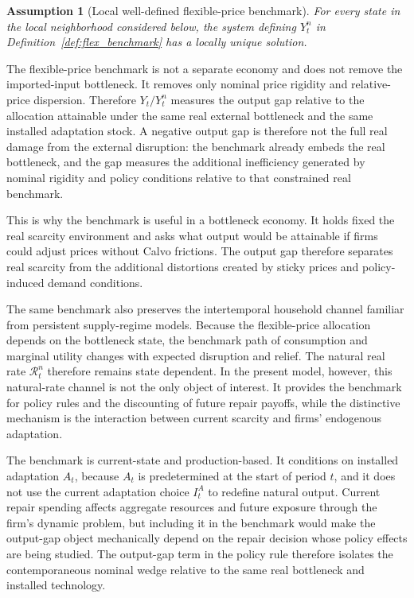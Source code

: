 ﻿\documentclass[12pt]{article}
\newtheorem{assumption}{Assumption}
\theoremstyle{remark}
\begin{document}
\begin{assumption}[Local well-defined flexible-price benchmark]\label{ass:flex_benchmark_unique}
For every state in the local neighborhood considered below, the system defining
$Y_t^n$ in Definition~\ref{def:flex_benchmark} has a locally unique solution.
\end{assumption}

The flexible-price benchmark is not a separate economy and does not remove the imported-input
bottleneck. It removes only nominal price rigidity and relative-price dispersion. Therefore
$Y_t/Y_t^n$ measures the output gap relative to the allocation attainable under the same real
external bottleneck and the same installed adaptation stock. A negative output gap is therefore not
the full real damage from the external disruption: the benchmark already embeds the real bottleneck,
and the gap measures the additional inefficiency generated by nominal rigidity and policy
conditions relative to that constrained real benchmark.

This is why the benchmark is useful in a bottleneck economy. It holds fixed the real scarcity
environment and asks what output would be attainable if firms could adjust prices without Calvo
frictions. The output gap therefore separates real scarcity from the additional distortions created
by sticky prices and policy-induced demand conditions.

The same benchmark also preserves the intertemporal household channel familiar from persistent
supply-regime models. Because the flexible-price allocation depends on the bottleneck state, the
benchmark path of consumption and marginal utility changes with expected disruption and relief.
The natural real rate $\mathcal R_t^n$ therefore remains state dependent. In the present model,
however, this natural-rate channel is not the only object of interest. It provides the benchmark
for policy rules and the discounting of future repair payoffs, while the distinctive mechanism is
the interaction between current scarcity and firms' endogenous adaptation.

The benchmark is current-state and production-based. It conditions on installed adaptation $A_t$,
because $A_t$ is predetermined at the start of period $t$, and it does not use the current
adaptation choice $I_t^A$ to redefine natural output. Current repair spending affects aggregate
resources and future exposure through the firm's dynamic problem, but including it in the benchmark
would make the output-gap object mechanically depend on the repair decision whose policy effects are
being studied. The output-gap term in the policy rule therefore isolates the contemporaneous nominal
wedge relative to the same real bottleneck and installed technology.
\end{document}
